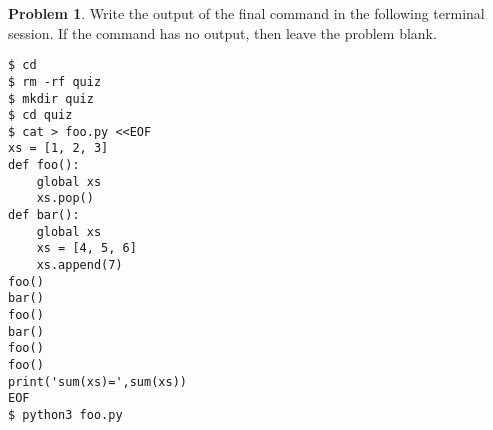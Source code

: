 \documentclass[10pt]{article}
\theoremstyle{definition}
\newtheorem{problem}{Problem}
\begin{document}
\begin{problem}
    Write the output of the final command in the following terminal session.
    If the command has no output, then leave the problem blank.
\end{problem}
\begin{lstlisting}
$ cd
$ rm -rf quiz
$ mkdir quiz
$ cd quiz
$ cat > foo.py <<EOF
xs = [1, 2, 3]
def foo():
    global xs
    xs.pop()
def bar():
    global xs
    xs = [4, 5, 6]
    xs.append(7)
foo()
bar()
foo()
bar()
foo()
foo()
print('sum(xs)=',sum(xs))
EOF
$ python3 foo.py
\end{lstlisting}
\vspace{0.4in}


\end{document}
